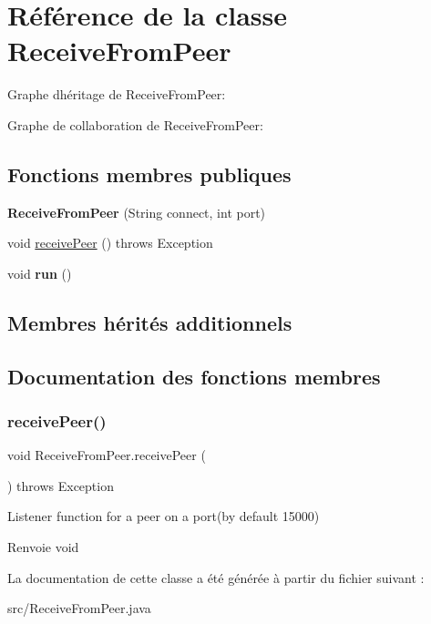 \hypertarget{classReceiveFromPeer}{}\section{Référence de la classe Receive\+From\+Peer}
\label{classReceiveFromPeer}


Graphe d\textquotesingle{}héritage de Receive\+From\+Peer\+:


Graphe de collaboration de Receive\+From\+Peer\+:
\subsection*{Fonctions membres publiques}
\begin{DoxyCompactItemize}
\item 
\mbox{\label{classReceiveFromPeer_ab109a50ae5515de73c7200f5788f8a98}} 
{\bfseries Receive\+From\+Peer} (String connect, int port)
\item 
void \hyperlink{classReceiveFromPeer_a86bb0d87446a94f020ac9d93c7c64eff}{receive\+Peer} ()  throws Exception
\item 
\mbox{\label{classReceiveFromPeer_ae4d38b0689a3855b153a519ce8867e86}} 
void {\bfseries run} ()
\end{DoxyCompactItemize}
\subsection*{Membres hérités additionnels}


\subsection{Documentation des fonctions membres}
\mbox{\label{classReceiveFromPeer_a86bb0d87446a94f020ac9d93c7c64eff}} 
\subsubsection{\texorpdfstring{receive\+Peer()}{receivePeer()}}
{\footnotesize\ttfamily void Receive\+From\+Peer.\+receive\+Peer (\begin{DoxyParamCaption}{ }\end{DoxyParamCaption}) throws Exception\hspace{0.3cm}{\ttfamily [inline]}}

Listener function for a peer on a port(by default 15000)

\begin{DoxyReturn}{Renvoie}
void 
\end{DoxyReturn}


La documentation de cette classe a été générée à partir du fichier suivant \+:\begin{DoxyCompactItemize}
\item 
src/Receive\+From\+Peer.\+java\end{DoxyCompactItemize}
